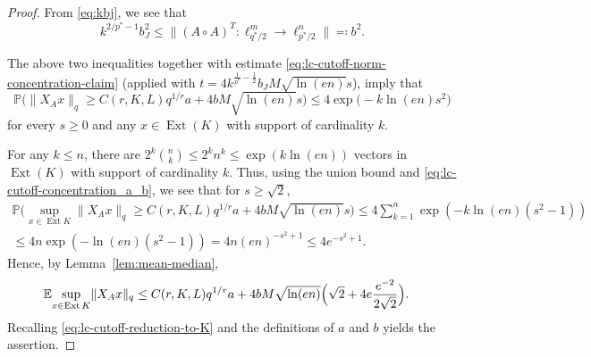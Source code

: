 \documentclass[a4paper]{amsart}
\theoremstyle{definition}
\theoremstyle{remark}
\numberwithin{equation}{section}
\newcommand*{\EE}{\mathbb{E}}
\newcommand*{\PP}{\mathbb{P}}
\newcommand*{\hadprod}{\mathbin{\circ}} %
\newcommand*{\Ext}{\operatorname{Ext}} %
\begin{document}
\begin{proof}
From \eqref{eq:kbj}, we see that
\[
	k^{2/p^*-1} b_J^2
	\leq  \|(A\hadprod A)^T \colon \ell^m_{q^*/2} \to \ell^n_{p^*/2}\| \eqqcolon b^2.
\]

	The above two inequalities together with estimate \eqref{eq:lc-cutoff-norm-concentration-claim}
	(applied with  $t=4k^{\frac 1{p^*}-\frac 12}b_J M\sqrt{\ln(en)} s$), imply that
	\begin{equation}
		 \label{eq:lc-cutoff-concentration_a_b}
	\PP\bigl(\|X_A x\|_q \geq C(r,K,L) q^{1/r}a +   4bM \sqrt{\ln(en)} s \bigr)
	 \leq  4 \exp\bigl( - k \ln(en)s^2\bigr)
	\end{equation}
	for every $s\geq 0$ and any $x\in \Ext(K)$ with support of cardinality $k$.
	
	For any $k\leq n$,
	there are $2^k \binom{n}{k} \leq 2^k n^k \leq \exp( k \ln(en))$ vectors in $\Ext(K)$
	with support of cardinality $k$.
	Thus, using the union bound and \eqref{eq:lc-cutoff-concentration_a_b}, we see that for $s\geq \sqrt{2}$,
	\begin{multline*}
	\PP\bigl(\sup_{x\in \Ext K}\! \|X_A x\|_q \geq
	C(r,K,L) q^{1/r}a +   4bM \sqrt{\ln(en)} s\bigr)
	\leq
	4\sum_{k=1}^n \exp( -k \ln(en)(s^2-1))	\\
	\leq 4n\exp( - \ln(en)(s^2-1))
	= 4n(en)^{-s^2+1}\leq 4 e^{-s^2+1}.
	\end{multline*}
	Hence, by Lemma~\ref{lem:mean-median},
	\begin{align*}
	\EE\! \sup_{x\in \Ext K}\! \|X_A x\|_q
	& \leq C(r,K,L)q^{1/r}a +  4b M \sqrt{\ln(en)}  \Bigl(\sqrt{2} +4  e \frac{e^{-2}}{2\sqrt{2}}\Bigr).
	\end{align*}
	Recalling \eqref{eq:lc-cutoff-reduction-to-K} and the definitions of $a$ and $b$ yields the assertion.
\end{proof}
\end{document}

